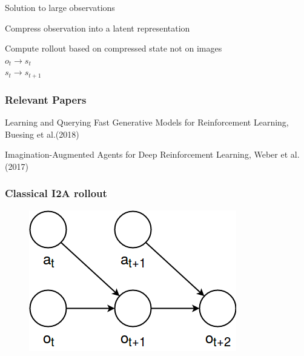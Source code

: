 \begin{frame}{Solution to large observations}
	\begin{PraesentationAufzaehlung}
	    \item Compress observation into a latent representation
	    \item Compute rollout based on compressed state not on images\\
	    $o_t \rightarrow s_t$\\
	    $s_t \rightarrow s_{t+1}$\\
	\end{PraesentationAufzaehlung}
\end{frame}


\begin{frame}
	\frametitle{Relevant Papers}
\begin{PraesentationAufzaehlung}
    \item Learning and Querying Fast Generative Models for Reinforcement Learning, Buesing et al.(2018)
    \bigskip
    \bigskip
    \item Imagination-Augmented Agents for Deep Reinforcement Learning, Weber et al.(2017)
\end{PraesentationAufzaehlung}

\end{frame}
\clearpage


\begin{frame}
	\frametitle{Classical I2A rollout}
	\begin{figure}[h]
		\centering
		\includegraphics[height=0.5\textheight]{./latent_i2a_images/Classic_I2A_Rollout.png}
	\end{figure}
\end{frame}

